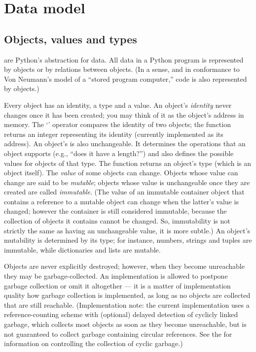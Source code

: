 \chapter{Data model\label{datamodel}}

\section{Objects, values and types\label{objects}}

 are Python's abstraction for data.  All data in a Python
program is represented by objects or by relations between objects.
(In a sense, and in conformance to Von Neumann's model of a
``stored program computer,'' code is also represented by objects.)

Every object has an identity, a type and a value.  An object's
\emph{identity} never changes once it has been created; you may think
of it as the object's address in memory.  The `' operator
compares the identity of two objects; the
 function returns an integer
representing its identity (currently implemented as its address).
An object's  is
also unchangeable.  It determines the operations that an object
supports (e.g., ``does it have a length?'') and also defines the
possible values for objects of that type.  The
 function returns an object's type
(which is an object itself).  The \emph{value} of some
objects can change.  Objects whose value can change are said to be
\emph{mutable}; objects whose value is unchangeable once they are
created are called \emph{immutable}.
(The value of an immutable container object that contains a reference
to a mutable object can change when the latter's value is changed;
however the container is still considered immutable, because the
collection of objects it contains cannot be changed.  So, immutability
is not strictly the same as having an unchangeable value, it is more
subtle.)
An object's mutability is determined by its type; for instance,
numbers, strings and tuples are immutable, while dictionaries and
lists are mutable.

Objects are never explicitly destroyed; however, when they become
unreachable they may be garbage-collected.  An implementation is
allowed to postpone garbage collection or omit it altogether --- it is
a matter of implementation quality how garbage collection is
implemented, as long as no objects are collected that are still
reachable.  (Implementation note: the current implementation uses a
reference-counting scheme with (optional) delayed detection of
cyclicly linked garbage, which collects most objects as soon as they
become unreachable, but is not guaranteed to collect garbage
containing circular references.  See the
 for
information on controlling the collection of cyclic garbage.)

